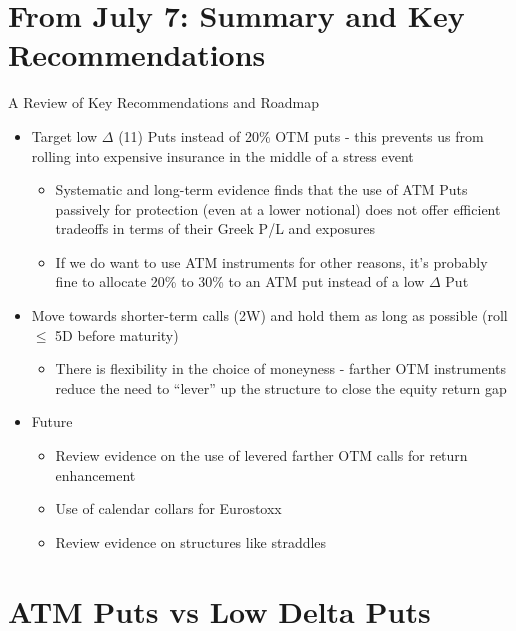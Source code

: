\documentclass{beamer}
\begin{document}
\section{From July 7: Summary and Key Recommendations}

\begin{frame}{A Review of Key Recommendations and Roadmap}

\begin{itemize}
\item Target low $\Delta$ (11) Puts instead of 20\% OTM puts - this prevents us from rolling into expensive insurance in the middle of a stress event
\begin{itemize}
\item Systematic and long-term evidence finds that the use of ATM Puts passively for protection (even at a lower notional) does not offer efficient tradeoffs in terms of their Greek P/L and exposures
\item If we do want to use ATM instruments for other reasons, it's probably fine to allocate 20\% to 30\% to an ATM put instead of a low $\Delta$ Put
\end{itemize}
\item Move towards shorter-term calls (2W) and hold them as long as possible (roll $\le$ 5D before maturity)

\begin{itemize}
\item There is flexibility in the choice of moneyness - farther OTM instruments reduce the need to ``lever'' up the structure to close the equity return gap
\end{itemize}

\item Future
\begin{itemize}
\item Review evidence on the use of levered farther OTM calls for return enhancement
\item Use of calendar collars for Eurostoxx
\item Review evidence on structures like straddles
\end{itemize}

\end{itemize}

\end{frame}


\section{ATM Puts vs Low Delta Puts}
\end{document}
